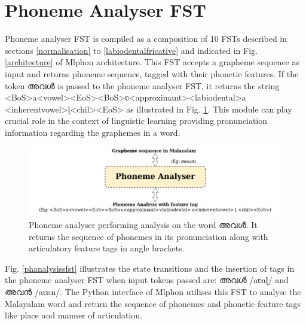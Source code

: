 
\section{Phoneme Analyser FST}

Phoneme analyser FST is compiled as a composition of 10 FSTs described in
sections \ref{normalisation} to \ref{labiodentalfricative} and indicated in
Fig. \ref{architecture} of Mlphon architecture. This FST accepts a grapheme
sequence as input and returns phoneme sequence, tagged with their phonetic
features. If the token {\mal അവൾ } is passed to the phoneme analyser FST, it
returns the string {\ipa <BoS>a<vowel><EoS><BoS>ʋ<approximant><labiodental>a
		<inherentvowel>ɭ<chil><EoS>} as illustrated in Fig. \ref{fig:analysisblock}. This
module can play crucial role in the context of linguistic learning providing
pronunciation information regarding the graphemes in a word.

\begin{figure}[htpb]
	\centering
	\includegraphics[width=0.9\linewidth]{phonemeanalyser.png}%
	\caption{Phoneme analyser performing analysis on the word {\mal അവൾ}. It returns the sequence of phonemes in its pronunciation along with articulatory feature tags in angle brackets.}
	\label{fig:analysisblock}
\end{figure}

Fig. \ref{phanalysissfst} illustrates the state transitions and the insertion
of tags in the phoneme analyser FST when input tokens passed are: {\mal അവൾ} {\ipa /aʋaɭ/} and {\mal അവൻ} {\ipa /aʋan}/. The Python interface of Mlphon utilises this FST to analyse the Malayalam word and return the sequence of phonemes and phonetic feature tags like place and manner of articulation.

